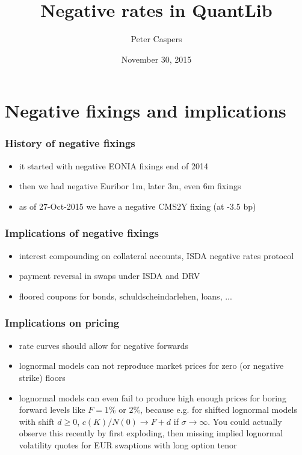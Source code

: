 \documentclass{beamer}
\begin{document}
\title{Negative rates in QuantLib}
\author{Peter Caspers}
\date{November 30, 2015}

\frame{\titlepage}


\section{Negative fixings and implications}

\begin{frame}[fragile]
\frametitle{History of negative fixings}
\begin{itemize}
\item it started with negative EONIA fixings end of 2014
\item then we had negative Euribor 1m, later 3m, even 6m fixings
\item as of 27-Oct-2015 we have a negative CMS2Y fixing (at -3.5 bp)
\end{itemize}
\end{frame}

\begin{frame}[fragile]
\frametitle{Implications of negative fixings}
\begin{itemize}
\item interest compounding on collateral accounts, ISDA negative rates protocol
\item payment reversal in swaps under ISDA and DRV
\item floored coupons for bonds, schuldscheindarlehen, loans, ...
\end{itemize}
\end{frame}

\begin{frame}[fragile]
\frametitle{Implications on pricing}
\begin{itemize}
\item rate curves should allow for negative forwards
\item lognormal models can not reproduce market prices for zero (or negative strike) floors
\item lognormal models can even fail to produce high enough prices for boring forward levels like $F=1\%$ or $2\%$, because e.g. for shifted lognormal models with shift $d\geq0$, $c(K)/N(0)\rightarrow F+d$ if $\sigma\rightarrow\infty$. You could actually observe this recently by first exploding, then missing implied lognormal volatility quotes for EUR swaptions with long option tenor
\end{itemize}
\end{frame}
\end{document}
